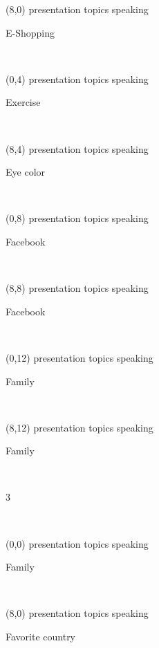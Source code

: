 \documentclass[a4paper]{article}
\newcommand{\mycard}[5]{%
	\small #1 #2
	\par
	\parbox[t][6.7cm][c]{9.5cm}{%
	\hspace{0.1cm} \Large#3\\
	\normalsize#4 #5
	}
}
\begin{document}
\begin{textblock}{8}(8,0)
\mycard{presentation topics}{speaking}{\parbox{9.0cm}{
\centering E-Shopping 
}}{}{} 
\end{textblock}

\begin{textblock}{8}(0,4)
\mycard{presentation topics}{speaking}{\parbox{9.0cm}{
\centering Exercise     
}}{}{} 
\end{textblock}

\begin{textblock}{8}(8,4)
\mycard{presentation topics}{speaking}{\parbox{9.0cm}{
\centering Eye color     
}}{}{} 
\end{textblock}

\begin{textblock}{8}(0,8)
\mycard{presentation topics}{speaking}{\parbox{9.0cm}{
\centering Facebook    
}}{}{} 
\end{textblock}

\begin{textblock}{8}(8,8)
\mycard{presentation topics}{speaking}{\parbox{9.0cm}{
\centering Facebook         
}}{}{} 
\end{textblock}

\begin{textblock}{8}(0,12)
\mycard{presentation topics}{speaking}{\parbox{9.0cm}{
\centering Family     
}}{}{} 
\end{textblock}

\begin{textblock}{8}(8,12)
\mycard{presentation topics}{speaking}{\parbox{9.0cm}{
\centering Family      
}}{}{} 
\end{textblock}

\begin{tiny}3\end{tiny}\\
\newpage

\begin{textblock}{8}(0,0)
\mycard{presentation topics}{speaking}{\parbox{9.0cm}{
\centering Family       
}}{}{} 
\end{textblock}

\begin{textblock}{8}(8,0)
\mycard{presentation topics}{speaking}{\parbox{9.0cm}{
\centering Favorite country   
}}{}{} 
\end{textblock}
\end{document}
